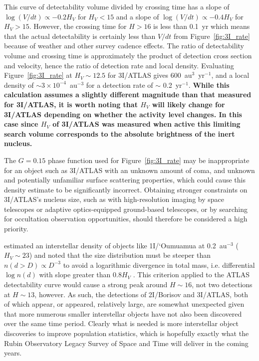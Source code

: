 \documentclass[linenumbers,twocolumn,longbib]{aastex7}
\begin{document}
This curve of detectability volume divided by crossing time has a slope of $\log(V/dt)\propto -0.2H_V$ for $H_V<15$ and a slope of $\log(V/dt)\propto -0.4H_V$ for $H_V>15$.  However, the crossing time for $H>16$ is less than 0.1~yr which means that the actual detectability is certainly less than $V/dt$ from Figure~\ref{fig:3I_rate} because of weather and other survey cadence effects. The ratio of detectability volume and crossing time is approximately the product of detection cross section and velocity, hence the ratio of detection rate and local density.  Evaluating Figure~\ref{fig:3I_rate} at $H_V\sim12.5$ for 3I/ATLAS gives $600$~au$^3$~yr$^{-1}$, and a local density of $\sim3\times10^{-4}$~au$^{-3}$ for a detection rate of $\sim$ 0.2~yr$^{-1}$. \textbf{While this calculation assumes a slightly different magnitude than that measured for 3I/ATLAS, it is worth noting that $H_V$ will likely change for 3I/ATLAS depending on whether the activity level changes. In this case since $H_V$ of 3I/ATLAS was measured when active this limiting search volume corresponds to the absolute brightness of the inert nucleus.}

The $G=0.15$ phase function used for Figure~\ref{fig:3I_rate} may be inappropriate for an object such as 3I/ATLAS with an unknown amount of coma, and unknown and potentially unfamiliar surface scattering properties, which could cause this density estimate to be significantly incorrect.  Obtaining stronger constraints on 3I/ATLAS's nucleus size, such as with high-resolution imaging by space telescopes or adaptive optics-equipped ground-based telescopes, or by searching for occultation observation opportunities, should therefore be considered a high priority.


\cite{Do2018} estimated an interstellar density of objects like 1I/`Oumuamua at 0.2~au$^{-3}$ ($H_V\sim23$) and noted that the size distribution must be steeper than $n(d>D)\propto D^{-3}$ to avoid a logarithmic divergence in total mass, i.e. differential $\log n(d)$ with slope greater than $0.8H_V$ \citep[see Fig. 3 of ][]{Do2018}.  This criterion applied to the ATLAS detectability curve would cause a strong peak around $H\sim16$, not two detections at $H\sim13$, however.  As such, the detections of 2I/Borisov and 3I/ATLAS, both of which appear, or appeared, relatively large, are somewhat unexpected given that more numerous smaller interstellar objects have not also been discovered over the same time period.  Clearly what is needed is more interstellar object discoveries to improve population statistics, which is hopefully exactly what the Rubin Observatory Legacy Survey of Space and Time \citep[LSST;][]{jones2009_lsst} will deliver in the coming years.
\end{document}
